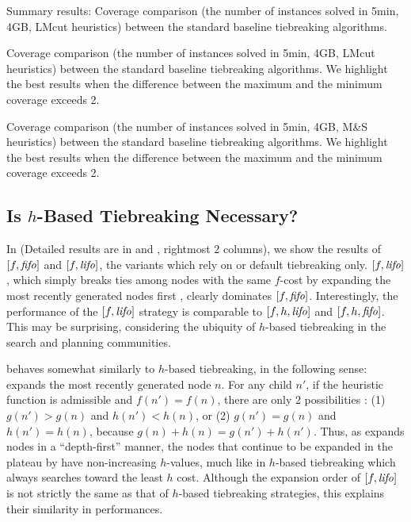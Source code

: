 \begin{table}[htbp]
 {
 \centering
 
 \caption{
 Summary results: Coverage comparison (the number of instances solved in 5min, 4GB, LMcut
 heuristics) between
 the standard baseline tiebreaking algorithms. 
 }
 \label{tbl:summary-std}
 }
\end{table}


\begin{table}[htbp]
 {
 \centering
 
 \caption{
 Coverage comparison (the number of instances solved in 5min, 4GB, LMcut
 heuristics) between
 the standard baseline tiebreaking algorithms. We highlight the
 best results when the difference between the maximum and the minimum coverage exceeds 2.
 }
 \label{tbl:lmcut-ipc-std}
 }
\end{table}

\begin{table}[htbp]
 {
 \centering
 
 \caption{
 Coverage comparison (the number of instances solved in 5min, 4GB, M\&S heuristics) between
 the standard baseline tiebreaking algorithms. We highlight the
 best results when the difference between the maximum and the minimum coverage exceeds 2.
 }
 \label{tbl:mands-ipc-std}
 }
\end{table}

\subsection{Is $h$-Based Tiebreaking Necessary?}

\label{sec:noh}

In  (Detailed results are in  and , rightmost 2 columns),
we show the results of $[f, {\text{\textit{fifo}}}]$ and
$[f, {\text{\textit{lifo}}}]$, the \astar variants which rely on \fifo or \lifo
default tiebreaking only.  $[f,{\text{\textit{lifo}}}]$, which simply breaks ties
among nodes with the same $f$-cost by expanding the most recently
generated nodes first \cite{korf1985depth}, clearly dominates
$[f,{\text{\textit{fifo}}}]$.  Interestingly, the performance of the $[f,{\text{\textit{lifo}}}]$ strategy
is comparable to $[f,h,{\text{\textit{lifo}}}]$ and $[f,h,{\text{\textit{fifo}}}]$.
This may be surprising, considering the ubiquity of $h$-based tiebreaking in the search and planning communities.

\lifo behaves somewhat similarly to $h$-based tiebreaking, in the following sense:
\lifo expands the most recently generated node $n$.
For any child $n'$, 
if the heuristic function is admissible and $f(n') = f(n)$, there are only 2 possibilities :
(1) $g(n') > g(n)$ and $h(n') < h(n)$, or
(2) $g(n') = g(n)$ and $h(n') = h(n)$,
because $g(n)+h(n)=g(n')+h(n')$.
Thus, as \lifo expands nodes in a ``depth-first'' manner,
the nodes that continue to be expanded in the plateau by \lifo have non-increasing $h$-values,
much like in $h$-based tiebreaking which always searches toward the least $h$ cost.
Although the expansion order of $[f,{\text{\textit{lifo}}}]$ is not strictly the same as that of $h$-based tiebreaking strategies,
this explains their similarity in performances.

